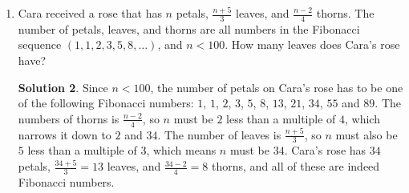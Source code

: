 \documentclass{article}
\theoremstyle{definition}
\newtheorem*{solution}{Solution}
\begin{document}
\begin{enumerate}
        Northeast-Southwest (NE-SW), North-South (N-S), and Northwest-Southeast
        (NW-SE). If the lawn is first mowed E-W on Day $1$, on Day $201$ in
        which direction is the lawn mowed, E-W, NE-SW, N-S, or NW-SE?
        \begin{solution}
            The lawn is mowed on days $1, 6, 11, 16, \dot, 191, 196, 201$. This
            is an arithmetic sequence and the common difference is $5$, since
            the lawn is mowed every $5$ days. To get from $1$ to $201$, the
            common difference will have been added $\frac{201 - 1}{5} =
            \frac{200}{5} = 40$ times. This means day $201$ will be the $41$st
            mowing. For the first $40$ mowing days, the lawn will have been
            mowed $\frac{40}{4} = 10$ times in each of the directions E-W,
            NE-SW, N-S, and NW-SE. Therefore, for the $41$st mowing, on Day
            $201$, the sequence of directions will begin again with a mowing in
            the direction on E-W or East-West.
        \end{solution}
        \item Cara received a rose that has $n$ petals, $\frac{n + 5}{3}$
        leaves, and $\frac{n-2}{4}$ thorns. The number of petals, leaves, and
        thorns are all numbers in the Fibonacci sequence $(1, 1, 2, 3, 5, 8,
        \dots)$, and $n < 100$. How many leaves does Cara's rose have?
        \begin{solution}
            Since $n < 100$, the number of petals on Cara's rose has to be one
            of the following Fibonacci numbers: $1$, $1$, $2$, $3$, $5$, $8$,
            $13$, $21$, $34$, $55$ and $89$. The numbers of thorns is $\frac{n -
            2}{4}$, so $n$ must be $2$ less than a multiple of $4$, which
            narrows it down to $2$ and $34$. The number of leaves is $\frac{n +
            5}{3}$, so $n$ must also be $5$ less than a multiple of $3$, which
            means $n$ must be $34$. Cara's rose has $34$ petals, $\frac{34 +
            5}{3} = 13$ leaves, and $\frac{34 - 2}{4} = 8$ thorns, and all of
            these are indeed Fibonacci numbers.
        \end{solution}
    \end{enumerate}
\end{document}

